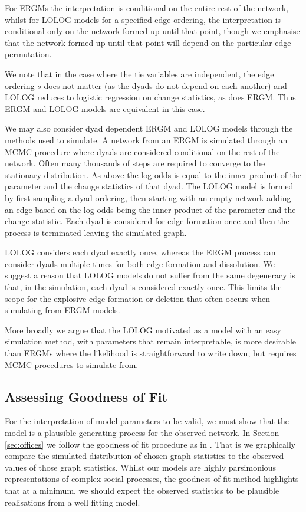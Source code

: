 \documentclass[
]{statsoc}
\begin{document}
For ERGMs the interpretation is conditional on the entire rest of the
network, whilst for LOLOG models for a specified edge ordering, the
interpretation is conditional only on the network formed up until that
point, though we emphasise that the network formed up until that point
will depend on the particular edge permutation.

We note that in the case where the tie variables are independent, the
edge ordering \(s\) does not matter (as the dyads do not depend on each
another) and LOLOG reduces to logistic regression on change statistics,
as does ERGM. Thus ERGM and LOLOG models are equivalent in this case.

We may also consider dyad dependent ERGM and LOLOG models through the
methods used to simulate. A network from an ERGM is simulated through an
MCMC procedure where dyads are considered conditional on the rest of the
network. Often many thousands of steps are required to converge to the
stationary distribution. As above the log odds is equal to the inner
product of the parameter and the change statistics of that dyad. The
LOLOG model is formed by first sampling a dyad ordering, then starting
with an empty network adding an edge based on the log odds being the
inner product of the parameter and the change statistic. Each dyad is
considered for edge formation once and then the process is terminated
leaving the simulated graph.

LOLOG considers each dyad exactly once, whereas the ERGM process can
consider dyads multiple times for both edge formation and dissolution.
We suggest a reason that LOLOG models do not suffer from the same
degeneracy is that, in the simulation, each dyad is considered exactly
once. This limits the scope for the explosive edge formation or deletion
that often occurs when simulating from ERGM models.

More broadly we argue that the LOLOG motivated as a model with an easy
simulation method, with parameters that remain interpretable, is more
desirable than ERGMs where the likelihood is straightforward to write
down, but requires MCMC procedures to simulate from.

\subsection{Assessing Goodness of Fit}

For the interpretation of model parameters to be valid, we must show
that the model is a plausible generating process for the observed
network. In Section \ref{sec:offices} we follow the goodness of fit
procedure as in \cite{Hunter_Goodreau_2008}. That is we graphically
compare the simulated distribution of chosen graph statistics to the
observed values of those graph statistics. Whilst our models are highly
parsimonious representations of complex social processes, the goodness
of fit method highlights that at a minimum, we should expect the
observed statistics to be plausible realisations from a well fitting
model.
\end{document}
